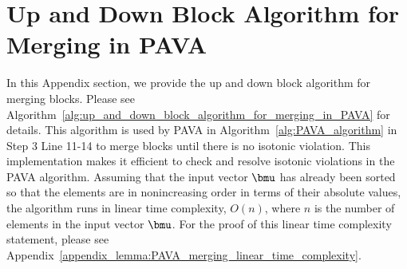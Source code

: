 \section{Up and Down Block Algorithm for Merging in PAVA}
\label{appendix_sec:up_and_down_block_algorithm_for_merging_in_PAVA}

In this Appendix section, we provide the up and down block algorithm for merging blocks. 
Please see Algorithm~\ref{alg:up_and_down_block_algorithm_for_merging_in_PAVA} for details.
This algorithm is used by PAVA in Algorithm~\ref{alg:PAVA_algorithm} in Step 3 Line 11-14 to merge blocks until there is no isotonic violation.
This implementation makes it efficient to check and resolve isotonic violations in the PAVA algorithm.
Assuming that the input vector $\bmu$ has already been sorted so that the elements are in nonincreasing order in terms of their absolute values, the algorithm runs in linear time complexity, $O(n)$, where $n$ is the number of elements in the input vector $\bmu$.
For the proof of this linear time complexity statement, please see Appendix~\ref{appendix_lemma:PAVA_merging_linear_time_complexity}.


